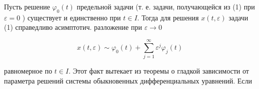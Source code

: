 \documentclass[10pt]{article}
\begin{document}
Пусть решение $\varphi_{0}(t)$ предельной задачи (т. е. задачи, получающейся из (1) при $\varepsilon=0$ ) существует и единственно при $t \in I$. Тогда для решения $x(t, \varepsilon)$ задачи (1) справедливо асимптотич. разложение при $\varepsilon \rightarrow 0$



\[

x(t, \varepsilon) \sim \varphi_{0}(t)+\sum_{j=1}^{\infty} \varepsilon^{j} \varphi_{j}(t)

\]



равномерное по $t \in I$. Этот факт вытекает из теоремы о гладкой зависимости от параметра решений системы обыкновенных дифференциальных уравнений. Если
\end{document}
